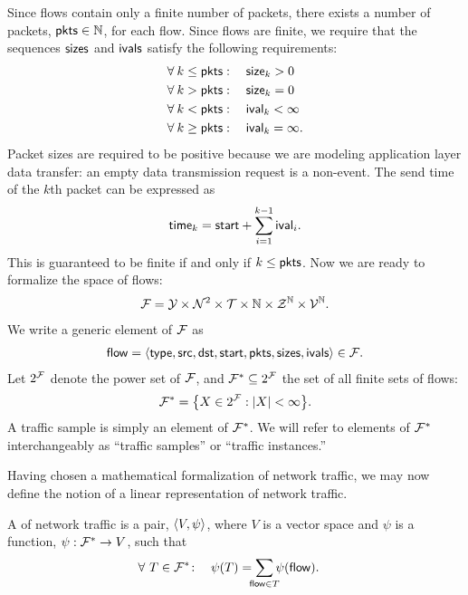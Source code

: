 \documentclass[twocolumn,final]{svjour3}
\begin{document}
Since flows contain only a finite number of packets, there exists a number of packets, $\text{\textsf{pkts}} \in \mathbb{N}$, for each flow. Since flows are finite, we require that the sequences $\text{\textsf{sizes}}$ and $\text{\textsf{ivals}}$ satisfy the following requirements:
\begin{align}
&\forall\: k \le \pkts: \quad \size_k > 0       \eqn{positive-packets}  \\
&\forall\: k >   \pkts: \quad \size_k = 0       \eqn{zero-packets}      \\
&\forall\: k <   \pkts: \quad \ival_k < \infty  \eqn{finite-intervals}  \\
&\forall\: k \ge \pkts: \quad \ival_k = \infty. \eqn{infinite-intervals}
\end{align}
Packet sizes are required to be positive because we are modeling application layer data transfer:
an empty data transmission request is a non-event.
The send time of the $k$th packet can be expressed as
\begin{align}
\text{\textsf{time}}_k = \text{\textsf{start}} + \sum_{i=1}^{k-1} \text{\textsf{ival}}_i.
\end{align}
This is guaranteed to be finite if and only if $k \le \text{\textsf{pkts}}$.
Now we are ready to formalize the space of flows:
\begin{align}
  \mathcal{F} =
    \mathcal{Y}    \times
    \mathcal{N}^2  \times
    \mathcal{T}    \times
    \mathbb{N}        \times
    \mathcal{Z}^{\mathbb{N}}  \times
    \mathcal{V}^{\mathbb{N}}.
\end{align}
We write a generic element of $\mathcal{F}$ as
\begin{align}
  \text{\textsf{flow}} = {\left<
    \text{\textsf{type}},
    \text{\textsf{src}},
    \text{\textsf{dst}},
    \text{\textsf{start}},
    \text{\textsf{pkts}},
    \text{\textsf{sizes}},
    \text{\textsf{ivals}}
  \right>} \in \mathcal{F}.
\end{align}
Let $2^{\mathcal{F}}$ denote the power set of $\mathcal{F}$, and $\mathcal{F}^* \subseteq 2^{\mathcal{F}}$ the set of all finite sets of flows:
\begin{align}
  \mathcal{F}^* = {\left\{X \in 2^{\mathcal{F}} : {\left|X\right|} < \infty\right\}}.
\end{align}
A traffic sample is simply an element of $\mathcal{F}^*$. We will refer to elements of $\mathcal{F}^*$ interchangeably as ``traffic samples'' or ``traffic instances.''

Having chosen a mathematical formalization of network traffic, we may now define the notion of a linear representation of network traffic.

\begin{definition}
A  of network traffic is a pair, ${\left<V,\psi\right>}$, where $V$ is a vector space and $\psi$ is a function, $\psi: \mathcal{F}^* \to V$, such that
\begin{align}\eqn{linearity}
\forall~T \in \Traffic\!:\quad
  \psi(T) &= \sum_{\mathclap{\flow \in T}}{\psi(\flow)}.
\end{align}
\end{definition}
\end{document}
